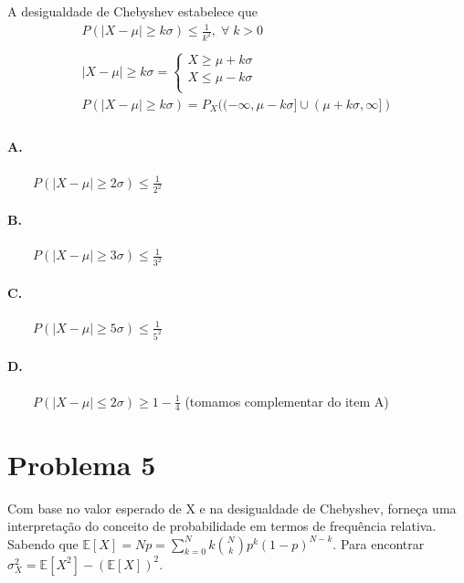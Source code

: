\documentclass{article}
\begin{document}
A desigualdade de Chebyshev estabelece que
\begin{align*}
P(|X - \mu| \geq k \sigma) \leq \frac{1}{k^2}, \; \forall \; k > 0 \\
\\
| X - \mu | \geq k \sigma =
\begin{cases}
    X \geq \mu + k \sigma \\
    X \leq \mu - k \sigma \\
\end{cases} \\
P(|X - \mu| \geq k \sigma) = P_X((-\infty, \mu-k\sigma] \cup (\mu+k\sigma, \infty]) \\[-1.25em]
\end{align*}
\paragraph*{A.} $\qquad P(|X - \mu| \ge 2\sigma) \le \frac{1}{2^{2}}$
\paragraph*{B.} $\qquad P(|X - \mu| \ge 3\sigma) \le \frac{1}{3^{2}}$
\paragraph*{C.} $\qquad P(|X - \mu| \ge 5\sigma) \le \frac{1}{5^{2}}$
\paragraph*{D.} $\qquad P(|X - \mu| \le 2\sigma) \ge 1 - \frac{1}{4}$ (tomamos complementar do item
A)
\\[0.5em]
\section*{Problema 5}
Com base no valor esperado de X e na desigualdade de Chebyshev, forneça uma interpretação do
conceito de probabilidade em termos de frequência relativa.
\\
Sabendo que $\mathbb{E}[X] = Np = \sum_{k=0}^{N} k {N \choose k} p^{k} (1-p)^{N-k}$. Para
encontrar $\sigma_X^2 = \mathbb{E}[X^2] - (\mathbb{E}[X])^2$.
\end{document}
